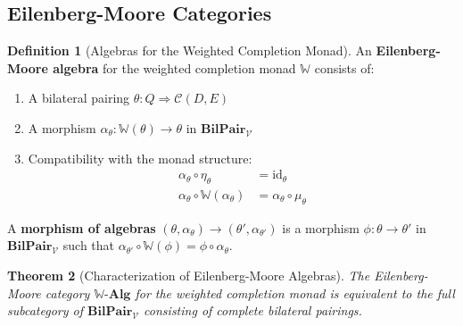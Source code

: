 \documentclass[11pt]{article}
\theoremstyle{plain}
\newtheorem{theorem}{Theorem}[section]
\theoremstyle{definition}
\newtheorem{definition}[theorem]{Definition}
\theoremstyle{remark}
\newcommand{\V}{\mathcal{V}}
\newcommand{\C}{\mathcal{C}}
\newcommand{\id}{\mathrm{id}}
\begin{document}
\subsection{Eilenberg-Moore Categories}

\begin{definition}[Algebras for the Weighted Completion Monad]\label{def:completion-algebras}
An \textbf{Eilenberg-Moore algebra} for the weighted completion monad $\mathbb{W}$ consists of:
\begin{enumerate}
\item A bilateral pairing $\theta : Q \Rightarrow \C(D, E)$
\item A morphism $\alpha_\theta : \mathbb{W}(\theta) \to \theta$ in $\mathbf{BilPair}_\V$
\item Compatibility with the monad structure:
\begin{align}
\alpha_\theta \circ \eta_\theta &= \id_\theta \\
\alpha_\theta \circ \mathbb{W}(\alpha_\theta) &= \alpha_\theta \circ \mu_\theta
\end{align}
\end{enumerate}

A \textbf{morphism of algebras} $(\theta, \alpha_\theta) \to (\theta', \alpha_{\theta'})$ is a morphism $\phi : \theta \to \theta'$ in $\mathbf{BilPair}_\V$ such that $\alpha_{\theta'} \circ \mathbb{W}(\phi) = \phi \circ \alpha_\theta$.
\end{definition}

\begin{theorem}[Characterization of Eilenberg-Moore Algebras]\label{thm:em-characterization}
The Eilenberg-Moore category $\mathbb{W}\text{-}\mathbf{Alg}$ for the weighted completion monad is equivalent to the full subcategory of $\mathbf{BilPair}_\V$ consisting of complete bilateral pairings.
\end{theorem}
\end{document}
